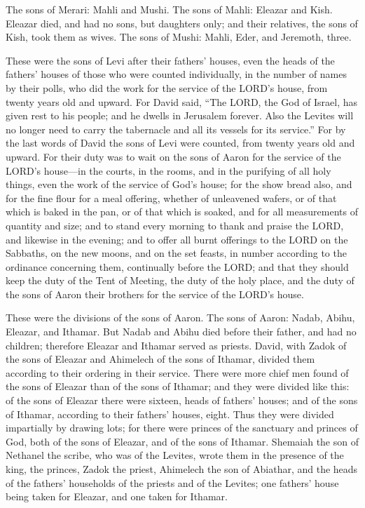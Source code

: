 \myverse{}The sons of Merari: Mahli and Mushi. The sons of Mahli: Eleazar
and Kish.
\myverse{}Eleazar died, and had no sons, but daughters only; and their relatives, the
sons of Kish, took them as wives.
\myverse{}The sons of Mushi: Mahli, Eder, and Jeremoth, three.

\myverse{}These were the sons of Levi after their fathers’ houses, even
the heads of the fathers’ houses of those who were counted individually, in the number of names by their
polls, who did the work for the service of the LORD’s house, from twenty years old and upward.
\myverse{}For David said, “The LORD, the God of Israel, has given rest to his people;
and he dwells in Jerusalem forever.
\myverse{}Also the Levites will no longer need to carry the tabernacle and all its
vessels for its service.”
\myverse{}For by the last words of David the sons of Levi were counted, from twenty
years old and upward.
\myverse{}For their duty was to wait on the sons of Aaron for the service of the LORD’s
house—in the courts, in the rooms, and in the purifying of all holy things, even the work of the service
of God’s house;
\myverse{}for the show bread also, and for the fine flour for a meal offering, whether
of unleavened wafers, or of that which is baked in the pan, or of that which is soaked, and for all measurements
of quantity and size;
\myverse{}and to stand every morning to thank and praise the LORD, and likewise in
the evening;
\myverse{}and to offer all burnt offerings to the LORD on the Sabbaths, on the new
moons, and on the set feasts, in number according to the ordinance concerning them, continually before
the LORD;
\myverse{}and that they should keep the duty of the Tent of Meeting, the duty of the
holy place, and the duty of the sons of Aaron their brothers for the service of the LORD’s house.


\mychapter{} \myverse*{}These were the divisions of the sons of Aaron. The sons of Aaron:
Nadab, Abihu, Eleazar, and Ithamar.
\myverse{}But Nadab and Abihu died before their father, and had no children; therefore
Eleazar and Ithamar served as priests.
\myverse{}David, with Zadok of the sons of Eleazar and Ahimelech of the sons of Ithamar,
divided them according to their ordering in their service.
\myverse{}There were more chief men found of the sons of Eleazar than of the sons of
Ithamar; and they were divided like this: of the sons of Eleazar there were sixteen, heads of fathers’
houses; and of the sons of Ithamar, according to their fathers’ houses, eight.
\myverse{}Thus they were divided impartially by drawing lots; for there were princes
of the sanctuary and princes of God, both of the sons of Eleazar, and of the sons of Ithamar.
\myverse{}Shemaiah the son of Nethanel the scribe, who was of the Levites, wrote them
in the presence of the king, the princes, Zadok the priest, Ahimelech the son of Abiathar, and the heads
of the fathers’ households of the priests and of the Levites; one fathers’ house being taken for Eleazar,
and one taken for Ithamar.

